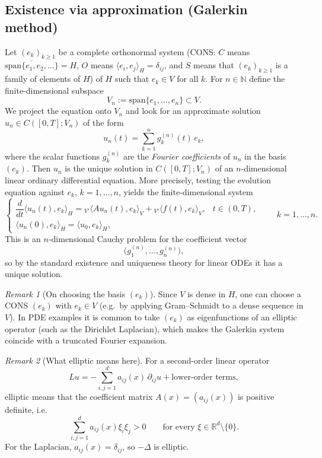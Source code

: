 \documentclass[11pt]{article}
\theoremstyle{definition}
\theoremstyle{remark}
\newtheorem{remark}{Remark}
\newcommand{\dual}[2]{{}_{V'}\langle #1, #2 \rangle_{V}}
\begin{document}
\subsection*{Existence via approximation (Galerkin method)}

Let $(e_k)_{k\ge 1}$ be a complete orthonormal system (CONS: $C$ means
$\overline{\mathrm{span}\{e_1,e_2,\dots\}}=H$, $O$ means
$\langle e_i,e_j\rangle_H=\delta_{ij}$, and $S$ means that $(e_k)_{k\ge 1}$ is a family
of elements of $H$) of $H$ such that $e_k\in V$ for all $k$.
For $n\in\mathbb{N}$ define the finite-dimensional subspace
\[
V_n := \mathrm{span}\{e_1,\dots,e_n\}\subset V.
\]
We project the equation onto $V_n$ and look for an approximate solution $u_n\in C([0,T];V_n)$ of
the form
\[
u_n(t)=\sum_{k=1}^n g_k^{(n)}(t)\,e_k,
\]
where the scalar functions $g_k^{(n)}$ are the \emph{Fourier coefficients} of $u_n$ in the basis $(e_k)$.
Then $u_n$ is the unique solution in $C([0,T];V_n)$ of an $n$-dimensional linear ordinary
differential equation. More precisely, testing the evolution equation against $e_k$,
$k=1,\dots,n$, yields the finite-dimensional system
\[
\begin{cases}
\dfrac{d}{dt}\langle u_n(t),e_k\rangle_H = \dual{Au_n(t)}{e_k} + \dual{f(t)}{e_k}, & t\in(0,T),\\[6pt]
\langle u_n(0),e_k\rangle_H = \langle u_0,e_k\rangle_H, &
\end{cases}
\qquad k=1,\dots,n.
\]
This is an $n$-dimensional Cauchy problem for the coefficient vector
\[
\bigl(g_1^{(n)},\dots,g_n^{(n)}\bigr),
\]
so by the standard existence and uniqueness theory for linear ODEs it has a unique solution.

\begin{remark}[On choosing the basis $(e_k)$]
Since $V$ is dense in $H$, one can choose a CONS $(e_k)$ with $e_k\in V$ (e.g.\ by applying Gram--Schmidt to a dense sequence in $V$).
In PDE examples it is common to take $(e_k)$ as eigenfunctions of an elliptic operator (such as the Dirichlet Laplacian), which makes the Galerkin system coincide with a truncated Fourier expansion.
\end{remark}

\begin{remark}[What elliptic means here]
For a second-order linear operator
\[
Lu=-\sum_{i,j=1}^d a_{ij}(x)\,\partial_{ij}u+\text{lower-order terms},
\]
elliptic means that the coefficient matrix $A(x)=(a_{ij}(x))$ is positive definite, i.e.
\[
\sum_{i,j=1}^d a_{ij}(x)\xi_i\xi_j>0
\qquad\text{for every }\xi\in\mathbb{R}^d\setminus\{0\}.
\]
For the Laplacian, $a_{ij}(x)=\delta_{ij}$, so $-\Delta$ is elliptic.
\end{remark}
\end{document}
